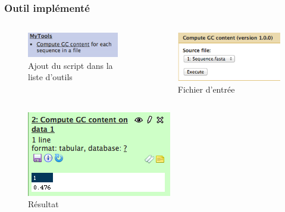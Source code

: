 \documentclass[12pt]{beamer}
\begin{document}
\begin{frame}
\begin{center}

\frametitle{Outil implémenté}
\begin{columns}
\begin{column}{5cm}
  \begin{figure}
   \begin{center}
 \includegraphics[scale=0.5]{img/Ongletmytools.png}
 	\caption{Ajout du script dans la liste d'outils}
   \end{center}
  \end{figure}
  \end{column}
  \begin{column}{5cm}
  \begin{figure}
   \begin{center}
\includegraphics[scale=0.4]{img/Gccontent.png}
   	\caption{Fichier d'entrée}

   	\end{center}
  \end{figure}
  \end{column}
\end{columns}
\begin{figure}
   \begin{center}
 \includegraphics[scale=0.4]{img/Resultatgc.png}
 	\caption{Résultat}
   \end{center}
  \end{figure}
\end{center}
\end{frame}
\end{document}
